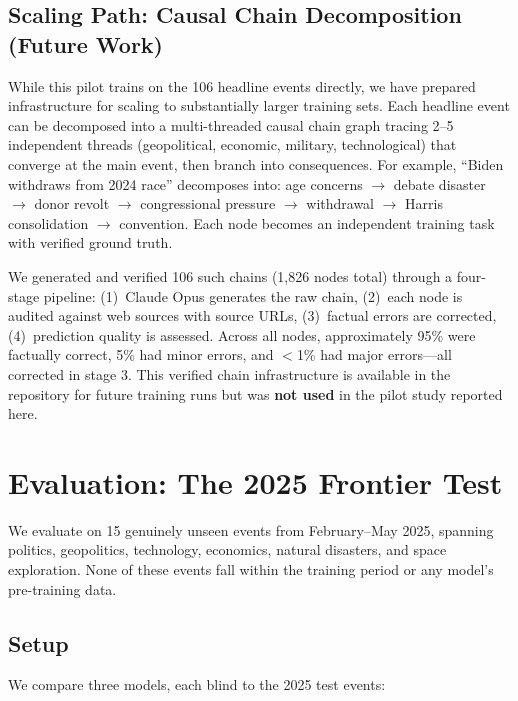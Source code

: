 \documentclass[11pt,a4paper]{article}
\begin{document}
\subsection{Scaling Path: Causal Chain Decomposition (Future Work)}

While this pilot trains on the 106 headline events directly, we have prepared infrastructure for scaling to substantially larger training sets. Each headline event can be decomposed into a multi-threaded causal chain graph tracing 2--5 independent threads (geopolitical, economic, military, technological) that converge at the main event, then branch into consequences. For example, ``Biden withdraws from 2024 race'' decomposes into: age concerns $\to$ debate disaster $\to$ donor revolt $\to$ congressional pressure $\to$ withdrawal $\to$ Harris consolidation $\to$ convention. Each node becomes an independent training task with verified ground truth.

We generated and verified 106 such chains (1,826 nodes total) through a four-stage pipeline: (1)~Claude Opus generates the raw chain, (2)~each node is audited against web sources with source URLs, (3)~factual errors are corrected, (4)~prediction quality is assessed. Across all nodes, approximately 95\% were factually correct, 5\% had minor errors, and $<$1\% had major errors---all corrected in stage 3. This verified chain infrastructure is available in the repository for future training runs but was \textbf{not used} in the pilot study reported here.

\section{Evaluation: The 2025 Frontier Test}
\label{sec:experiment}

We evaluate on 15 genuinely unseen events from February--May 2025, spanning politics, geopolitics, technology, economics, natural disasters, and space exploration. None of these events fall within the training period or any model's pre-training data.

\subsection{Setup}
\label{sec:setup}

We compare three models, each blind to the 2025 test events:
\end{document}
